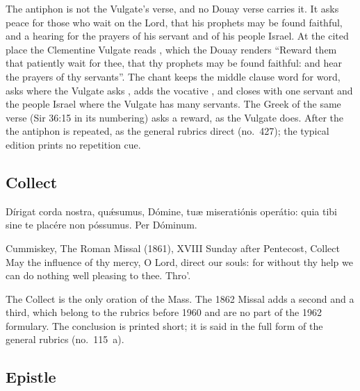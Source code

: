 \noindent The antiphon is not the Vulgate's verse, and no Douay verse carries
it. It asks peace for those who wait on the Lord, that his prophets may be
found faithful, and a hearing for the prayers of his servant and of his people
Israel. At the cited place the Clementine Vulgate reads , which the Douay renders ``Reward them that patiently wait
for thee, that thy prophets may be found faithful: and hear the prayers of thy
servants''. The chant keeps the middle clause word for word, asks
 where the Vulgate asks , adds the vocative
, and closes with one servant and the people Israel where the
Vulgate has many servants. The Greek of the same verse (Sir 36:15 in its
numbering) asks a reward, as the Vulgate does. After the 
the antiphon is repeated, as the general rubrics direct (no.~427); the typical
edition prints no repetition cue.

\subsection{Collect}
\label{proper-collect}


\begin{latinproper}
Dírigat corda nostra, quǽsumus, Dómine, tuæ miseratiónis operátio: quia tibi
sine te placére non póssumus. Per Dóminum.
\end{latinproper}

\begin{englishwitness}{Cummiskey, The Roman Missal (1861), XVIII Sunday after Pentecost, Collect}
May the influence of thy mercy, O Lord, direct our souls: for without thy help
we can do nothing well pleasing to thee. Thro'.
\end{englishwitness}

\noindent The Collect is the only oration of the Mass. The 1862 Missal adds a
second and a third, which belong to the rubrics before 1960 and are no part of
the 1962 formulary. The conclusion is printed short; it is said in the full
form of the general rubrics (no.~115~a).

\subsection{Epistle}
\label{proper-epistle}

